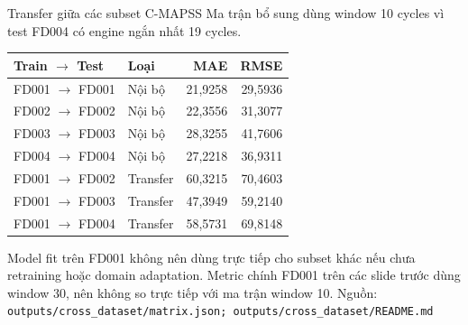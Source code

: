 \documentclass[aspectratio=169,professionalfonts]{beamer}
\newcommand{\source}[1]{\vfill\hspace{0pt}\scriptsize\color{muted}Nguồn: \nolinkurl{#1}}
\begin{document}
\begin{frame}{Transfer giữa các subset C-MAPSS}
\small
Ma trận bổ sung dùng window 10 cycles vì test FD004 có engine ngắn nhất 19 cycles.

\begin{table}
\centering\scriptsize
\begin{tabular}{llrr}
\toprule
Train $\rightarrow$ Test & Loại & MAE & RMSE\\
\midrule
FD001 $\rightarrow$ FD001 & Nội bộ & 21,9258 & 29,5936\\
FD002 $\rightarrow$ FD002 & Nội bộ & 22,3556 & 31,3077\\
FD003 $\rightarrow$ FD003 & Nội bộ & 28,3255 & 41,7606\\
FD004 $\rightarrow$ FD004 & Nội bộ & 27,2218 & 36,9311\\
FD001 $\rightarrow$ FD002 & Transfer & 60,3215 & 70,4603\\
FD001 $\rightarrow$ FD003 & Transfer & 47,3949 & 59,2140\\
FD001 $\rightarrow$ FD004 & Transfer & 58,5731 & 69,8148\\
\bottomrule
\end{tabular}
\end{table}

Model fit trên FD001 không nên dùng trực tiếp cho subset khác nếu chưa retraining
hoặc domain adaptation. Metric chính FD001 trên các slide trước dùng window 30,
nên không so trực tiếp với ma trận window 10.
\source{outputs/cross_dataset/matrix.json; outputs/cross_dataset/README.md}
\end{frame}
\end{document}
